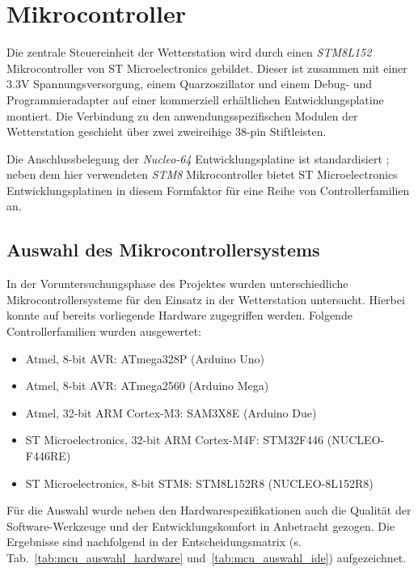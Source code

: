 \section{Mikrocontroller}
    Die zentrale Steuereinheit der Wetterstation wird durch einen \emph{STM8L152} Mikrocontroller von ST Microelectronics gebildet. Dieser ist zusammen mit einer 3.3V Spannungsversorgung, einem Quarzoszillator und einem Debug- und Programmieradapter auf einer kommerziell erhältlichen Entwicklungsplatine montiert. Die Verbindung zu den anwendungsspezifischen Modulen der Wetterstation geschieht über zwei zweireihige 38-pin Stiftleisten.
    
    Die Anschlussbelegung der \emph{Nucleo-64} Entwicklungsplatine ist standardisiert \cite{st_nucleo}; neben dem hier verwendeten \emph{STM8} Mikrocontroller bietet ST Microelectronics Entwicklungsplatinen in diesem Formfaktor für eine Reihe von Controllerfamilien an.
    
    \subsection{Auswahl des Mikrocontrollersystems}
    In der Voruntersuchungsphase des Projektes wurden unterschiedliche Mikrocontrollersysteme für den Einsatz in der Wetterstation untersucht. Hierbei konnte auf bereits vorliegende Hardware zugegriffen werden. Folgende Controllerfamilien wurden ausgewertet:
    \begin{itemize}
        \item Atmel, 8-bit AVR: ATmega328P (Arduino Uno)
        \item Atmel, 8-bit AVR: ATmega2560 (Arduino Mega)
        \item Atmel, 32-bit ARM Cortex-M3: SAM3X8E (Arduino Due)
        \item ST Microelectronics, 32-bit ARM Cortex-M4F: STM32F446 (NUCLEO-F446RE)
        \item ST Microelectronics, 8-bit STM8: STM8L152R8 (NUCLEO-8L152R8)
    \end{itemize}
    
    Für die Auswahl wurde neben den Hardwarespezifikationen auch die Qualität der Software-Werkzeuge und der Entwicklungskomfort in Anbetracht gezogen. Die Ergebnisse sind nachfolgend in der Entscheidungsmatrix (s. Tab.~\ref{tab:mcu_auswahl_hardware} und~\ref{tab:mcu_auswahl_ide}) aufgezeichnet.
    
